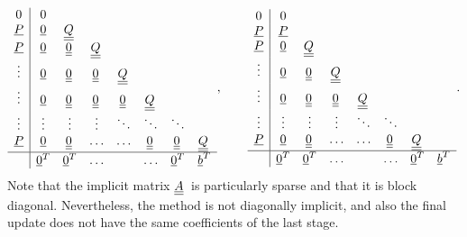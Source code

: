 %
\begin{equation}\label{eq:ImExADER_RK_ButcherTableu}
\begin{array}{c|ccccccc}
0 & 0 &   & &  & & &   \\
\vec{P} & \vec{0} &\mat{Q}  &   & & &    \\
\vec{P}  & \vec{0} &\mat{0} &   \mat{Q} & & & &  \\
\vdots & \vec{0} & \mat{0}  &\mat{0} &\mat{Q}   && & \\
\vdots & \vec{0} &  \mat{0}   &   \mat{0}  &\mat{0} & \mat{Q}  &  &   \\
\vdots &  \vdots  &  \vdots &  \vdots &  \ddots  &  \ddots&\ddots &  \\
\vec{P} & \vec{0} &  \mat{0}  &  \hdots &  \hdots & \mat{0}  & \mat{0} & \mat{Q}  \\
\hline
&  \vec{0}^T  & \vec{0}^T    & \hdots  &   &   \hdots &    \vec{0}^T& \vec{b}^{T} 
\end{array},\qquad
\begin{array}{c|ccccccc}
0 & 0 &   & &  & & &   \\
\vec{P} & \vec{P} &  &   & & & &   \\
\vec{P}  & \vec{0} &   \mat{Q} & & & & & \\
\vdots & \vec{0} & \mat{0}  &\mat{Q}   && & & \\
\vdots & \vec{0} &  \mat{0}   &   \mat{0}  & \mat{Q}  &  &  & \\
\vdots &  \vdots  &  \vdots &  \vdots &  \ddots  &  \ddots& &  \\
\vec{P} & \vec{0} &  \mat{0}  &  \hdots &  \hdots & \mat{0}  &  \mat{Q} & \\
\hline
&  \vec{0}^T  & \vec{0}^T    & \hdots  &   &   \hdots &    \vec{0}^T& \vec{b}^{T} 
\end{array}.
\end{equation}
Note that the implicit matrix $\mat{A}$ is particularly sparse and that it is block diagonal. Nevertheless, the method is not diagonally implicit, and also the final update does not have the same coefficients of the last stage.

